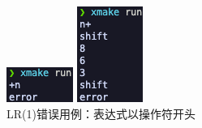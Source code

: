 \begin{figure}[htbp]
    \centering
    \begin{minipage}[t]{0.2\textwidth}
        \centering
        \includegraphics[width=\textwidth]{images/lr_7.png}
        \caption{LR(1)错误用例：表达式以操作符开头}
        \label{fig:lr-7}
    \end{minipage}
    \begin{minipage}[t]{0.2\textwidth}
        \centering
        \includegraphics[width=\textwidth]{images/lr_8.png}

\end{minipage}
\end{figure}
